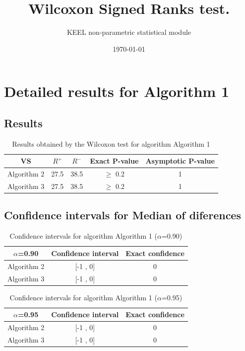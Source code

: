 \documentclass[a4paper,10pt]{article}
\title{Wilcoxon Signed Ranks test.}
\date{\today}
\author{KEEL non-parametric statistical module}
\begin{document}
\pagestyle{empty}
\maketitle
\thispagestyle{empty}



\section{Detailed results for Algorithm 1}


\subsection{Results}

\begin{table}[!htp]
\centering\small
\begin{tabular}{
|c|c|c|c|c|}
\hline
 VS & $R^{+}$ & $R^{-}$ & Exact P-value & Asymptotic P-value \\ \hline 
Algorithm 2 & 27.5 & 38.5 & $\geq$ 0.2 & 1\\ \hline 
Algorithm 3 & 27.5 & 38.5 & $\geq$ 0.2 & 1\\ \hline 

\end{tabular}
\caption{Results obtained by the Wilcoxon test for algorithm Algorithm 1}
\end{table}

\subsection{Confidence intervals for Median of diferences}

\begin{table}[!htp]
\centering\small
\begin{tabular}{
|c|c|c|}
\hline
 $\alpha$=0.90 & Confidence interval & Exact confidence \\ \hline 
Algorithm 2 & [-1 , 0] & 0\\ \hline 
Algorithm 3 & [-1 , 0] & 0\\ \hline 

\end{tabular}
\caption{Confidence intervals for algorithm Algorithm 1 ($\alpha$=0.90)}
\end{table}
\begin{table}[!htp]
\centering\small
\begin{tabular}{
|c|c|c|}
\hline
 $\alpha$=0.95 & Confidence interval & Exact confidence \\ \hline 
Algorithm 2 & [-1 , 0] & 0\\ \hline 
Algorithm 3 & [-1 , 0] & 0\\ \hline 

\end{tabular}
\caption{Confidence intervals for algorithm Algorithm 1 ($\alpha$=0.95)}
\end{table}
\end{document}
